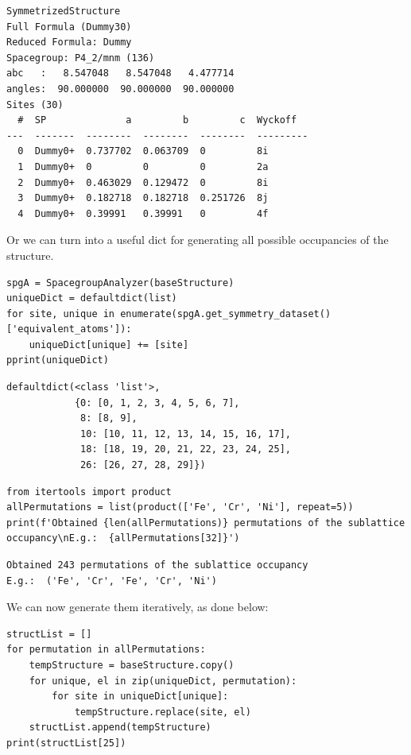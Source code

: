 \begin{verbatim}
SymmetrizedStructure
Full Formula (Dummy30)
Reduced Formula: Dummy
Spacegroup: P4_2/mnm (136)
abc   :   8.547048   8.547048   4.477714
angles:  90.000000  90.000000  90.000000
Sites (30)
  #  SP              a         b         c  Wyckoff
---  -------  --------  --------  --------  ---------
  0  Dummy0+  0.737702  0.063709  0         8i
  1  Dummy0+  0         0         0         2a
  2  Dummy0+  0.463029  0.129472  0         8i
  3  Dummy0+  0.182718  0.182718  0.251726  8j
  4  Dummy0+  0.39991   0.39991   0         4f
\end{verbatim}

Or we can turn into a useful dict for generating all possible
occupancies of the structure.

\begin{verbatim}
spgA = SpacegroupAnalyzer(baseStructure)
uniqueDict = defaultdict(list)
for site, unique in enumerate(spgA.get_symmetry_dataset()['equivalent_atoms']):
    uniqueDict[unique] += [site]
pprint(uniqueDict)
\end{verbatim}

\begin{verbatim}
defaultdict(<class 'list'>,
            {0: [0, 1, 2, 3, 4, 5, 6, 7],
             8: [8, 9],
             10: [10, 11, 12, 13, 14, 15, 16, 17],
             18: [18, 19, 20, 21, 22, 23, 24, 25],
             26: [26, 27, 28, 29]})
\end{verbatim}

\begin{verbatim}
from itertools import product
allPermutations = list(product(['Fe', 'Cr', 'Ni'], repeat=5))
print(f'Obtained {len(allPermutations)} permutations of the sublattice occupancy\nE.g.:  {allPermutations[32]}')
\end{verbatim}

\begin{verbatim}
Obtained 243 permutations of the sublattice occupancy
E.g.:  ('Fe', 'Cr', 'Fe', 'Cr', 'Ni')
\end{verbatim}

We can now generate them iteratively, as done below:

\begin{verbatim}
structList = []
for permutation in allPermutations:
    tempStructure = baseStructure.copy()
    for unique, el in zip(uniqueDict, permutation):
        for site in uniqueDict[unique]:
            tempStructure.replace(site, el)
    structList.append(tempStructure)
print(structList[25])
\end{verbatim}

